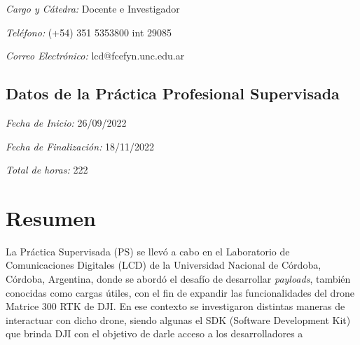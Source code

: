 \documentclass[12pt]{article}
\begin{document}
\textsl{Cargo y Cátedra:} Docente e Investigador

\textsl{Teléfono:} (+54) 351 5353800 int 29085

\textsl{Correo Electrónico:} lcd@fcefyn.unc.edu.ar

\subsection{Datos de la Práctica Profesional Supervisada}

\textsl{Fecha de Inicio:} 26/09/2022

\textsl{Fecha de Finalización:} 18/11/2022

\textsl{Total de horas:} 222

\tableofcontents
\newpage
\section{Resumen}
\setlength\parindent{24pt} La Práctica Supervisada (PS) se llevó a cabo en el Laboratorio de Comunicaciones Digitales (LCD) de la Universidad Nacional de Córdoba, Córdoba, Argentina, donde se abordó el desafío de desarrollar \textit{payloads}, también conocidas como cargas útiles, con el fin de expandir las funcionalidades del drone Matrice 300 RTK de DJI.
En ese contexto se investigaron distintas maneras de interactuar con dicho drone, siendo algunas el SDK (Software Development Kit) que brinda DJI con el objetivo de darle acceso a los desarrolladores a 
\end{document}
